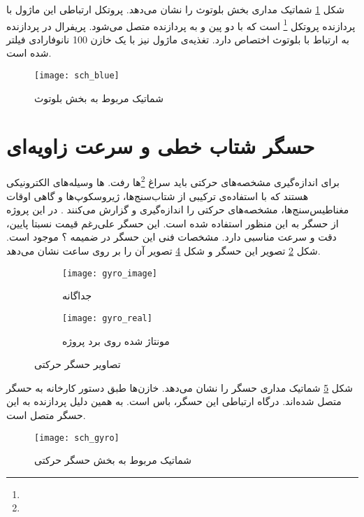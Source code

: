 شکل \ref{fig:sch-blue} شماتیک مداری بخش بلوتوث را نشان می‌دهد. پروتکل ارتباطی این ماژول با پردازنده پروتکل
 \footnote{}
است که با دو پین  و  به پردازنده متصل می‌شود. پریفرال  در پردازنده به ارتباط با بلوتوث اختصاص دارد. تغذیه‌ی ماژول نیز با یک خازن 100 نانوفارادی فیلتر شده است.

\begin{figure}[h]
	\centering
	\texttt{[image: sch\_blue]}
	\caption{شماتیک مربوط به بخش بلوتوث}
	\label{fig:sch-blue}
\end{figure}




\section{حسگر شتاب خطی و سرعت زاویه‌ای}
برای اندازه‌گیری مشخصه‌های حرکتی باید سراغ
\footnote{}ها
رفت. ها وسیله‌های الکترونیکی هستند که با استفاده‌ی ترکیبی از شتاب‌سنج‌ها، ژیروسکوپ‌ها و گاهی اوقات مغناطیس‌سنج‌ها، مشخصه‌های حرکتی را اندازه‌گیری و گزارش می‌کنند \cite{IMU}. در این پروژه از حسگر  به این منظور استفاده شده است. این حسگر علی‌رغم قیمت نسبتا پایین، دقت و سرعت مناسبی دارد. مشخصات فنی این حسگر در ضمیمه ؟ موجود است. شکل \ref{fig:gyro_image} تصویر این حسگر و شکل \ref{fig:gyro_real} تصویر آن را بر روی \pcbf ساعت نشان می‌دهد.

\begin{figure}[h]
	\centering
	\begin{subfigure}{0.5\textwidth}
		\centering
		\texttt{[image: gyro\_image]}
		\caption{جداگانه}
		\label{fig:gyro_image}
	\end{subfigure}
	\begin{subfigure}{0.44\textwidth}
		\centering
		\texttt{[image: gyro\_real]}
		\caption{مونتاژ شده روی برد پروژه}
		\label{fig:gyro_real}
	\end{subfigure}
	\caption{تصاویر حسگر حرکتی}
\end{figure}

شکل \ref{fig:sch-gyro} شماتیک مداری حسگر  را نشان می‌دهد. خازن‌ها طبق دستور کارخانه به حسگر متصل شده‌اند. درگاه ارتباطی این حسگر، باس  است. به همین دلیل  پردازنده به این حسگر متصل است.

\begin{figure}[h]
	\centering
	\texttt{[image: sch\_gyro]}
	\caption{شماتیک مربوط به بخش حسگر حرکتی}
	\label{fig:sch-gyro}
\end{figure}

